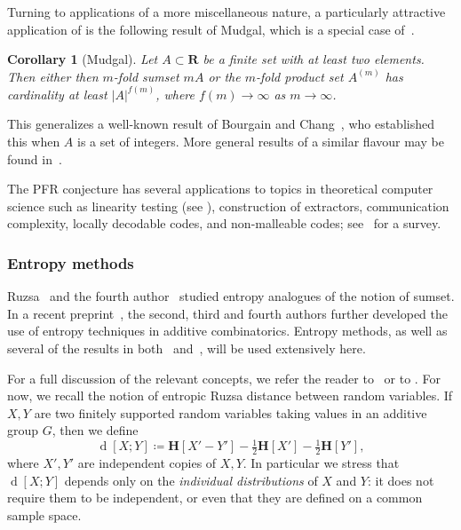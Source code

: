 \documentclass[12pt,reqno,tbtags]{amsart}
\newtheorem{corollary}[theorem]{Corollary}
\theoremstyle{definition}
\theoremstyle{remark}
\def\R{\mathbf{R}}
\newcommand{\ent}[1]{\mathbf{H}[#1]}
\newcommand{\dist}[2]{{\operatorname{d}[#1;#2]}} %
\numberwithin{equation}{section}
\begin{document}
Turning to applications of a more miscellaneous nature, a particularly attractive application of  is the following result of Mudgal, which is a special case of~\cite[Theorem 6.2]{mudgal}.

\begin{corollary}[Mudgal]
Let $A \subset \R$ be a finite set with at least two elements. Then either then $m$-fold sumset $mA$ or the $m$-fold product set $A^{(m)}$ has cardinality at least $|A|^{f(m)}$, where $f(m) \rightarrow \infty$ as $m \rightarrow \infty$.
\end{corollary}
This generalizes a well-known result of Bourgain and Chang~\cite{bourgain-chang}, who established this when $A$ is a set of integers. More general results of a similar flavour may be found in~\cite{mudgal}.

The PFR conjecture has several applications to topics in theoretical computer science such as linearity testing (see ), construction of extractors, communication complexity, locally decodable codes, and non-malleable codes; see~\cite{lovett-survey} for a survey.

\subsubsection*{Entropy methods}
Ruzsa~\cite{ruzsa-entropy} and the fourth author~\cite{tao-entropy} studied entropy analogues of the notion of sumset. In a recent preprint~\cite{gmt}, the second, third and fourth authors further developed the use of entropy techniques in additive combinatorics. Entropy methods, as well as several of the results in both~\cite{gmt} and~\cite{tao-entropy}, will be used extensively here.

For a full discussion of the relevant concepts, we refer the reader to~\cite{gmt} or to . For now, we recall the notion of entropic Ruzsa distance between random variables. If $X, Y$ are two finitely supported random variables taking values in an additive group $G$, then we define
\begin{equation}
\label{ruz-dist-def} \dist{X}{Y} \coloneqq \ent{X' - Y'} - \tfrac{1}{2} \ent{X'} - \tfrac{1}{2} \ent{Y'},
\end{equation}
where $X', Y'$ are independent copies of $X, Y$.
In particular we stress that $\dist{X}{Y}$ depends only on the \emph{individual distributions} of $X$ and $Y$: it does not require them to be independent, or even that they are defined on a common sample space.
\end{document}
